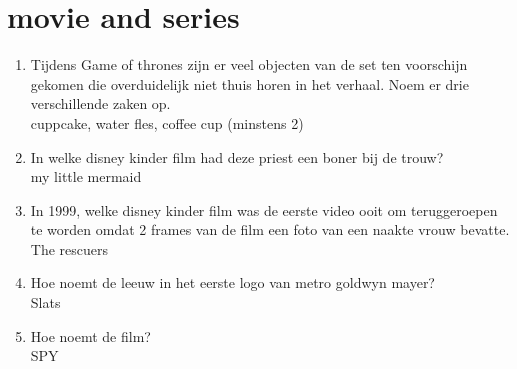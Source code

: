 \section{movie and series}
\begin{enumerate}
\item{Tijdens Game of thrones zijn er veel objecten van de set ten voorschijn gekomen die overduidelijk niet thuis horen in het verhaal. Noem er drie verschillende zaken op.\\ cuppcake, water fles, coffee cup (minstens 2)}
\item{In welke disney kinder film had deze priest een boner bij de trouw?\\ my little mermaid}
\item{In 1999, welke disney kinder film was de eerste video ooit om teruggeroepen te worden omdat 2 frames van de film een  foto van een naakte vrouw bevatte.\\ The rescuers}
\item{Hoe noemt de leeuw in het eerste logo van metro goldwyn mayer?\\ Slats}
\item{Hoe noemt de film?\\ SPY}
\end{enumerate}